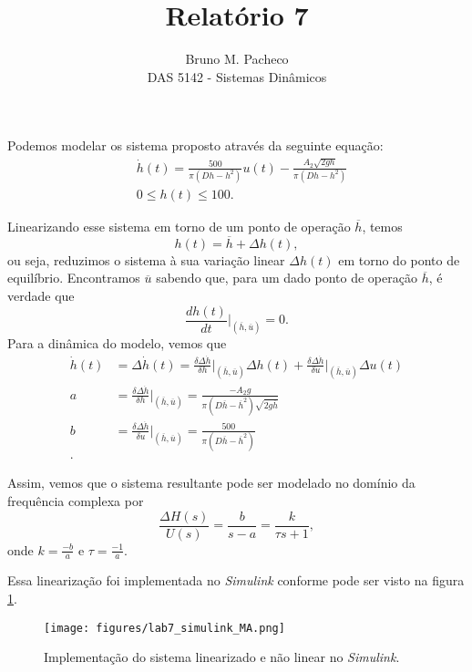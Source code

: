 \documentclass[a4paper]{report}
\begin{document}
\title{Relatório 7}
\author{Bruno M. Pacheco\\
DAS 5142 - Sistemas Dinâmicos}
 
\maketitle



Podemos modelar os sistema proposto através da seguinte equação:
\begin{align*}
    & \dot{h}(t) = \frac{500}{\pi\left( Dh - h^2 \right) }u(t) - \frac{A_2\sqrt{2gh} }{\pi\left( Dh - h^2 \right) } \\
    & 0\le h(t)\le 100
.\end{align*}

Linearizando esse sistema em torno de um ponto de operação $\overline{h}$, temos \[
h(t) = \overline{h} + \Delta h(t)
,\] ou seja, reduzimos o sistema à sua variação linear $\Delta h(t)$ em torno do ponto de equilíbrio. Encontramos $\overline{u}$ sabendo que, para um dado ponto de operação $\overline{h}$, é verdade que \[
\frac{d h(t)}{dt}\Bigr|_{(\overline{h},\overline{u})} = 0
.\] Para a dinâmica do modelo, vemos que
\begin{align*}
    \dot{h}(t) &= \Delta \dot{h}(t) = \frac{\delta \Delta \dot{h}}{\delta h}\Bigr|_{(\overline{h},\overline{u})}\Delta h(t) + \frac{\delta \Delta \dot{h}}{\delta u}\Bigr|_{(\overline{h},\overline{u})}\Delta u(t) \\
    a &= \frac{\delta \Delta \dot{h}}{\delta h}\Bigr|_{(\overline{h},\overline{u})} = \frac{-A_2g}{\pi\left( D\overline{h}- \overline{h}^2 \right)\sqrt{2g\overline{h}}}\\
    b &= \frac{\delta \Delta \dot{h}}{\delta u}\Bigr|_{(\overline{h},\overline{u})} = \frac{500}{\pi\left( D \overline{h}- \overline{h}^2 \right) } \\
.\end{align*}

Assim, vemos que o sistema resultante pode ser modelado no domínio da frequência complexa por \[
    \frac{\Delta H(s)}{U(s)} = \frac{b}{s-a} = \frac{k}{\tau s + 1}
,\] onde $k=\frac{-b}{a}$ e $\tau = \frac{-1}{a}$.

Essa linearização foi implementada no \emph{Simulink} conforme pode ser visto na figura \ref{fig:figures-lab7_simulink_MA-png}.

\begin{figure}[H]
    \centering
    \texttt{[image: figures/lab7\_simulink\_MA.png]}
    \caption{Implementação do sistema linearizado e não linear no \emph{Simulink}.}
    \label{fig:figures-lab7_simulink_MA-png}
\end{figure}
\end{document}

